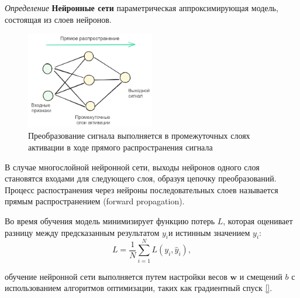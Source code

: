 \textit{Определение} \textbf{Нейронные сети} параметрическая аппроксимирующая модель, состоящая из слоев нейронов.

\begin{figure}[h]
  \centering
  \includegraphics[width=0.5\textwidth]{assets/ml/nn/nn.excalidraw.png}
  \caption{Преобразование сигнала выполняется в промежуточных слоях активации в ходе прямого распространения сигнала}
  \label{neural_net}
\end{figure}

В случае многослойной нейронной сети, выходы нейронов одного слоя становятся входами для следующего слоя, образуя цепочку преобразований. 
Процесс распостранения через нейроны последовательных слоев называется прямым распространением (forward propagation).

Во время обучения модель минимизирует функцию потерь \( L \), 
которая оценивает разницу между предсказанным результатом $y_i$и истинным значением $y_i$:
\begin{equation}
  L = \frac{1}{N} \sum_{i=1}^{N} L(y_i, \hat{y}_i),
\end{equation}

обучение нейронной сети выполняется путем настройки весов \( \mathbf{w} \) и смещений \( b \) 
с использованием алгоритмов оптимизации, таких как градиентный спуск \ref{}. 
